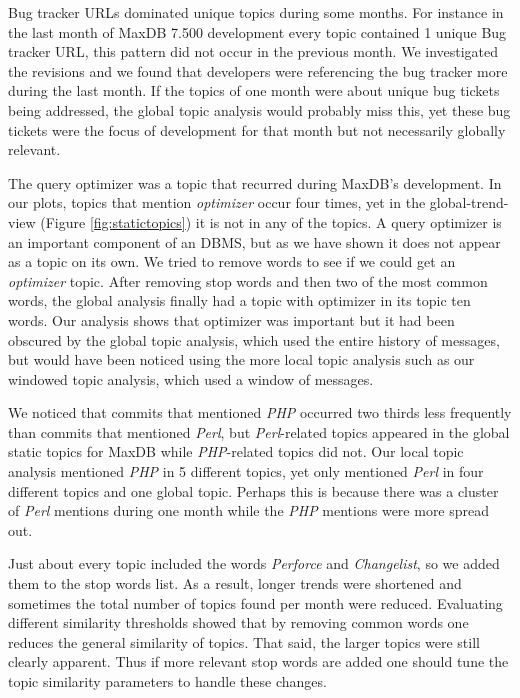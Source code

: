 \documentclass[times, 10pt,twocolumn]{article}
\newcommand{\hla}[1]{{\color{changecolor2} #1 }}
\begin{document}
Bug tracker URLs dominated unique topics during some months. For
instance in the last month of MaxDB 7.500 development every topic
contained 1 unique Bug tracker URL, this pattern did not occur in the
previous month. We investigated the revisions and we found that
developers were referencing the bug tracker more during the last
month.  If the topics of one month were about unique bug tickets being
addressed, the global topic analysis would probably miss this, yet
these bug tickets were the focus of development for that month but not
necessarily globally relevant.

The query optimizer was a topic that recurred during MaxDB's
development. In our plots, topics that mention \emph{optimizer} occur
four times, yet in the global-trend-view (Figure
\ref{fig:statictopics}) it is not in any of the topics. A query
optimizer is an important component of an DBMS, but as we have shown
it does not appear as a topic on its own. We tried to remove words to
see if we could get an \emph{optimizer} topic. After removing stop
words and then two of the most common words, the global analysis
\hla{
finally had a topic with optimizer in its topic ten words. Our
analysis shows that optimizer was important but it had been obscured
by the global topic analysis, which used the entire history of
messages, but would have been noticed using the more local topic
analysis such as our windowed topic analysis, which used a window of
messages.
}

We noticed that commits that mentioned \emph{PHP} occurred two thirds
less frequently than commits that mentioned \emph{Perl}, but
\emph{Perl}-related topics appeared in the global static topics for
MaxDB while \emph{PHP}-related topics did not.  Our local topic
analysis mentioned \emph{PHP} in 5 different topics, yet only
mentioned \emph{Perl} in four different topics and one global
topic. Perhaps this is because there was a cluster of \emph{Perl}
mentions during one month while the \emph{PHP} mentions were more
spread out.

Just about every topic included the words \emph{Perforce} and
\emph{Changelist}, so we added them to the stop words list. As a
result, longer trends were shortened and sometimes the total number of
topics found per month were reduced.  Evaluating different similarity
thresholds showed that by removing common words one reduces the
general similarity of topics. That said, the larger topics were still
clearly apparent. Thus if more relevant stop words are added one
should tune the topic similarity parameters to handle these changes.
\end{document}
